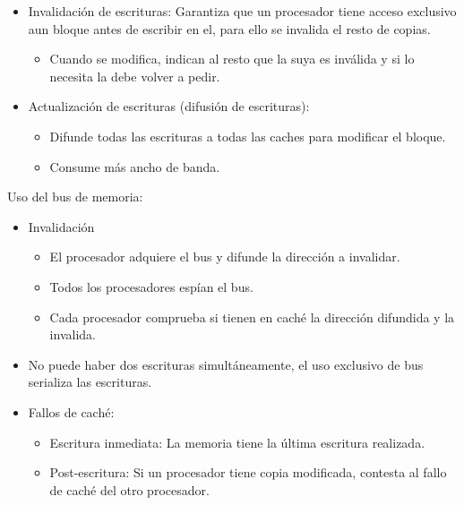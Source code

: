 \documentclass[12pt, twoside, openright]{report} %
\begin{document}
    \begin{itemize}
    
    \item
      Invalidación de escrituras: Garantiza que un procesador tiene
      acceso exclusivo aun bloque antes de escribir en el, para ello
      se invalida el resto de copias.

      \begin{itemize}
      
      \item
        Cuando se modifica, indican al resto que la suya es inválida y
        si lo necesita la debe volver a pedir.
      \end{itemize}
    \item
      Actualización de escrituras (difusión de escrituras):

      \begin{itemize}
      
      \item
        Difunde todas las escrituras a todas las caches para modificar
        el bloque.
      \item
        Consume más ancho de banda.
      \end{itemize}
    \end{itemize}

    Uso del bus de memoria:

    \begin{itemize}
    
    \item
      Invalidación

      \begin{itemize}
      
      \item
        El procesador adquiere el bus y difunde la dirección a
        invalidar.
      \item
        Todos los procesadores espían el bus.
      \item
        Cada procesador comprueba si tienen en caché la dirección
        difundida y la invalida.
      \end{itemize}
    \item
      No puede haber dos escrituras simultáneamente, el uso exclusivo
      de bus serializa las escrituras.
    \item
      Fallos de caché:

      \begin{itemize}
      
      \item
        Escritura inmediata: La memoria tiene la última escritura
        realizada.
      \item
        Post-escritura: Si un procesador tiene copia modificada,
        contesta al fallo de caché del otro procesador.
      \end{itemize}
    \end{itemize}
\end{document}
